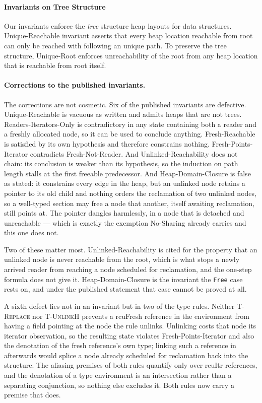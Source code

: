 \paragraph{Invariants on Tree Structure} Our invariants enforce the \textit{tree} structure heap layouts for data structures. \textsf{Unique-Reachable} invariant asserts that every heap location reachable from root can only be reached with following an unique path. To preserve the tree structure, \textsf{Unique-Root} enforces unreachability of the root from any heap location that is reachable from root itself. 

\paragraph{Corrections to the published invariants.}  The corrections are not cosmetic.  Six of the published invariants are defective.  \textsf{Unique-Reachable} is vacuous as written and admits heaps that are not trees.  \textsf{Readers-Iterators-Only} is contradictory in any state containing both a reader and a freshly allocated node, so it can be used to conclude anything.  \textsf{Fresh-Reachable} is satisfied by its own hypothesis and therefore constrains nothing.  \textsf{Fresh-Points-Iterator} contradicts \textsf{Fresh-Not-Reader}.  And \textsf{Unlinked-Reachability} does not chain: its conclusion is weaker than its hypothesis, so the induction on path length stalls at the first \textsf{freeable} predecessor.  And \textsf{Heap-Domain-Closure} is false as stated: it constrains every edge in the heap, but an unlinked node retains a pointer to its old child and nothing orders the reclamation of two unlinked nodes, so a well-typed section may free a node that another, itself awaiting reclamation, still points at.  The pointer dangles harmlessly, in a node that is detached and unreachable --- which is exactly the exemption \textsf{No-Sharing} already carries and this one does not.

Two of these matter most.  \textsf{Unlinked-Reachability} is cited for the property that an unlinked node is never reachable from the root, which is what stops a newly arrived reader from reaching a node scheduled for reclamation, and the one-step formula does not give it.  \textsf{Heap-Domain-Closure} is the invariant the \texttt{Free} case rests on, and under the published statement that case cannot be proved at all.

A sixth defect lies not in an invariant but in two of the type rules.  Neither \textsc{T-Replace} nor \textsc{T-UnlinkH} prevents a \textsf{rcuFresh} reference in the environment from having a field pointing at the node the rule unlinks.  Unlinking costs that node its \textsf{iterator} observation, so the resulting state violates \textsf{Fresh-Points-Iterator} and also the denotation of the fresh reference's own type; linking such a reference in afterwards would splice a node already scheduled for reclamation back into the structure.  The aliasing premises of both rules quantify only over \textsf{rcuItr} references, and the denotation of a type environment is an intersection rather than a separating conjunction, so nothing else excludes it.  Both rules now carry a premise that does.

